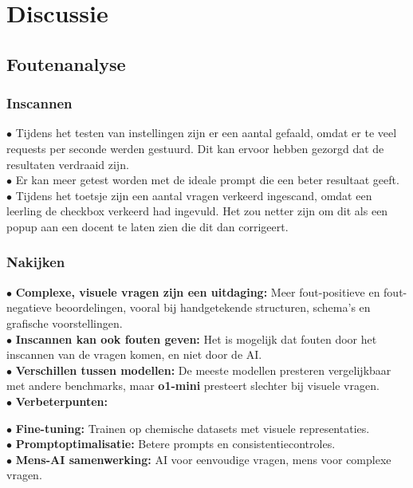\documentclass[12pt]{article}
\begin{document}
\pagebreak
\section{Discussie}
\subsection{Foutenanalyse}
\begin{multicols}{2}
\noindent\begin{minipage}{\linewidth}
    
\subsubsection{Inscannen}
$\bullet$ Tijdens het testen van instellingen zijn er een aantal gefaald, omdat er te veel requests per seconde werden gestuurd. Dit kan ervoor hebben gezorgd dat de resultaten verdraaid zijn.\\
$\bullet$ Er kan meer getest worden met de ideale prompt die een beter resultaat geeft. \\
$\bullet$ Tijdens het toetsje zijn een aantal vragen verkeerd ingescand, omdat een leerling de checkbox verkeerd had ingevuld. Het zou netter zijn om dit als een popup aan een docent te laten zien die dit dan corrigeert.\\
\end{minipage}

\noindent\begin{minipage}{\linewidth}
\subsubsection{Nakijken}
$\bullet$ \textbf{Complexe, visuele vragen zijn een uitdaging:} Meer fout-positieve en fout-negatieve beoordelingen, vooral bij handgetekende structuren, schema's en grafische voorstellingen.\\
$\bullet$ \textbf{Inscannen kan ook fouten geven:} Het is mogelijk dat fouten door het inscannen van de vragen komen, en niet door de AI.\\
$\bullet$ \textbf{Verschillen tussen modellen:} De meeste modellen presteren vergelijkbaar met andere benchmarks, maar \textbf{o1-mini} presteert slechter bij visuele vragen.\\
$\bullet$ \textbf{Verbeterpunten:}\\
\begin{minipage}{0.9\linewidth}
\hspace{3em}$\bullet$ \textbf{Fine-tuning:} Trainen op chemische datasets met visuele representaties.\\
\hspace{3em}$\bullet$ \textbf{Promptoptimalisatie:} Betere prompts en consistentiecontroles.\\
\hspace{3em}$\bullet$ \textbf{Mens-AI samenwerking:} AI voor eenvoudige vragen, mens voor complexe vragen.
\end{minipage}
\end{minipage}
\begin{minipage}{\linewidth}

\end{minipage}
\end{multicols}
\end{document}

